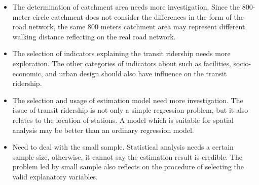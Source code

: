 %
\begin{itemize}
	\item The determination of catchment area needs more investigation. Since the 800-meter circle catchment does not consider the differences in the form of the road network, the same 800 meters catchment area may represent different walking distance reflecting on the real road network.
	
	\item The selection of indicators explaining the transit ridership needs more exploration. The other categories of indicators about such as facilities, socio-economic, and urban design should also have influence on the transit ridership.
	
	\item The selection and usage of estimation model need more investigation. The issue of transit ridership is not only a simple regression problem, but it also relates to the location of stations. A model which is suitable for spatial analysis may be better than an ordinary regression model. 
	
	\item Need to deal with the small sample. Statistical analysis needs a certain sample size, otherwise, it cannot say the estimation result is credible. The problem led by small sample also reflects on the procedure of selecting the valid explanatory variables. 
\end{itemize}


\clearpage %
% 

